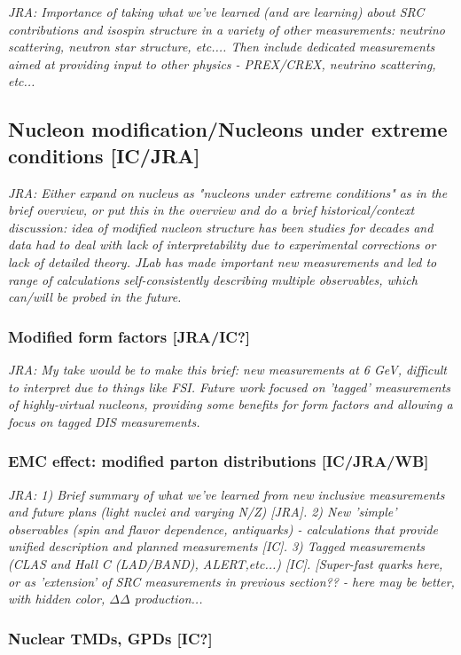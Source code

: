 \textit{JRA: Importance of taking what we've learned (and are learning) about SRC contributions and isospin structure in a variety of other measurements: neutrino scattering, neutron star structure, etc.... Then include dedicated measurements aimed at providing input to other physics - PREX/CREX, neutrino scattering, etc...}


\subsection{Nucleon modification/Nucleons under extreme conditions [IC/JRA]}\label{sec:4:emc}
\textit{JRA: Either expand on nucleus as "nucleons under extreme conditions" as in the brief overview, or put this in the overview and do a brief historical/context discussion: idea of modified nucleon structure has been studies for decades and data had to deal with lack of interpretability due to experimental corrections or lack of detailed theory. JLab has made important new measurements and led to range of calculations self-consistently describing multiple observables, which can/will be probed in the future.}

\subsubsection{Modified form factors [JRA/IC?]}
\textit{JRA: My take would be to make this brief: new measurements at 6 GeV, difficult to interpret due to things like FSI. Future work focused on 'tagged' measurements of highly-virtual nucleons, providing some benefits for form factors and allowing a focus on tagged DIS measurements.}

\subsubsection{EMC effect: modified parton distributions [IC/JRA/WB]}
\textit{JRA: 1) Brief summary of what we've learned from new inclusive measurements and future plans (light nuclei and varying N/Z) [JRA]. 2) New 'simple' observables (spin and flavor dependence, antiquarks) - calculations that provide unified description and planned measurements [IC]. 3) Tagged measurements (CLAS and Hall C (LAD/BAND), ALERT,etc...) [IC]. [Super-fast quarks here, or as 'extension' of SRC measurements in previous section?? - here may be better, with hidden color, $\Delta\Delta$ production...}

\subsubsection{Nuclear TMDs, GPDs [IC?]}


